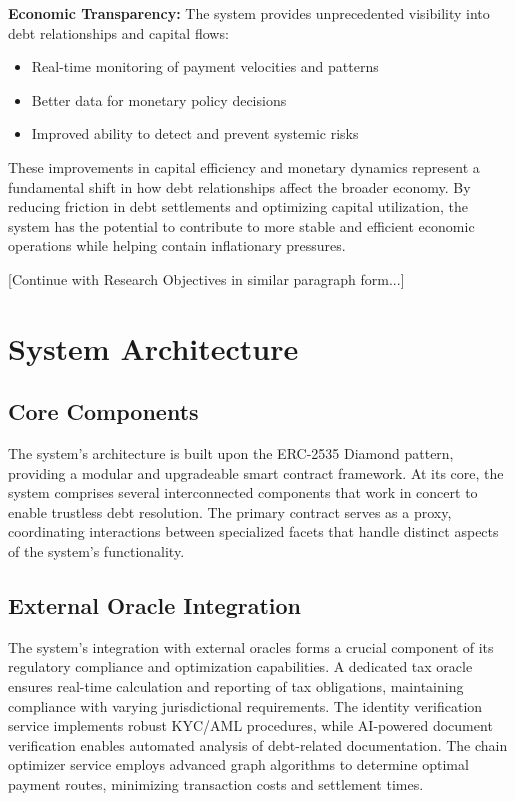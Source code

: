 \documentclass[twocolumn,10pt,a4paper]{article}
\begin{document}
\textbf{Economic Transparency:}
The system provides unprecedented visibility into debt relationships and capital flows:
\begin{itemize}
    \item Real-time monitoring of payment velocities and patterns
    \item Better data for monetary policy decisions
    \item Improved ability to detect and prevent systemic risks
\end{itemize}

These improvements in capital efficiency and monetary dynamics represent a fundamental shift in how debt relationships affect the broader economy. By reducing friction in debt settlements and optimizing capital utilization, the system has the potential to contribute to more stable and efficient economic operations while helping contain inflationary pressures.

[Continue with Research Objectives in similar paragraph form...]

\section{System Architecture}
\subsection{Core Components}
The system's architecture is built upon the ERC-2535 Diamond pattern, providing a modular and upgradeable smart contract framework. At its core, the system comprises several interconnected components that work in concert to enable trustless debt resolution. The primary contract serves as a proxy, coordinating interactions between specialized facets that handle distinct aspects of the system's functionality.

\subsection{External Oracle Integration}
The system's integration with external oracles forms a crucial component of its regulatory compliance and optimization capabilities. A dedicated tax oracle ensures real-time calculation and reporting of tax obligations, maintaining compliance with varying jurisdictional requirements. The identity verification service implements robust KYC/AML procedures, while AI-powered document verification enables automated analysis of debt-related documentation. The chain optimizer service employs advanced graph algorithms to determine optimal payment routes, minimizing transaction costs and settlement times.
\end{document}
